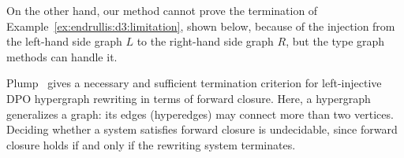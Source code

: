         On the other hand, our method cannot prove the termination of Example~\ref{ex:endrullis:d3:limitation}, shown below, because of the injection from the left-hand side graph $L$ to the right-hand side graph $R$, but the type graph methods can handle it.
    \begin{center}
    \end{center}

Plump~\cite{plump1995ontermination} gives a necessary and sufficient termination criterion for left-injective DPO hypergraph rewriting in terms of forward closure. Here, a hypergraph generalizes a graph: its edges (hyperedges) may connect more than two vertices. Deciding whether a system satisfies forward closure is undecidable, since forward closure holds if and only if the rewriting system terminates.

